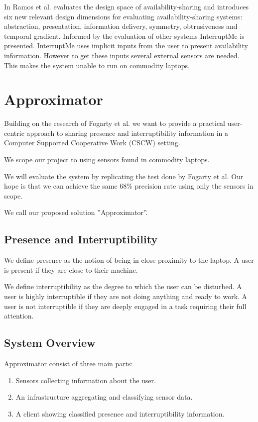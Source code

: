 \documentclass{sigchi}
\begin{document}
In \cite{hincapie2011design} Ramos et al. evaluates the design space of availability-sharing and introduces six new relevant design dimensions for evaluating availability-sharing systems: abstraction, presentation, information delivery, symmetry, obtrusiveness and temporal gradient.
Informed by the evaluation of other systems InterruptMe is presented.
InterruptMe uses implicit inputs from the user to present availability information.
However to get these inputs several external sensors are needed.
This makes the system unable to run on commodity laptops.

\section{Approximator}
Building on the research of Fogarty et al.\cite{fogarty2005predicting} we want to provide a practical user-centric approach to sharing presence and interruptibility information in a Computer Supported Cooperative Work (CSCW) setting.

 We scope our project to using sensors found in commodity laptops.

 We will evaluate the system by replicating the test done by Fogarty et al.
 Our hope is that we can achieve the same 68\% precision rate using only the sensors in scope.

We call our proposed solution ''Approximator''.

\subsection{Presence and Interruptibility}
We define presence as the notion of being in close proximity to the laptop. A user is present if they are close to their machine.

We define interruptibility as the degree to which the user can be disturbed. A user is highly interruptible if they are not doing anything and ready to work. A user is not interruptible if they are deeply engaged in a task requiring their full attention.

\subsection{System Overview}
Approximator consist of three main parts:
\begin{enumerate}
  \item Sensors collecting information about the user.
  \item An infrastructure aggregating and classifying sensor data.
  \item A client showing classified presence and interruptibility information.
\end{enumerate}
\end{document}
